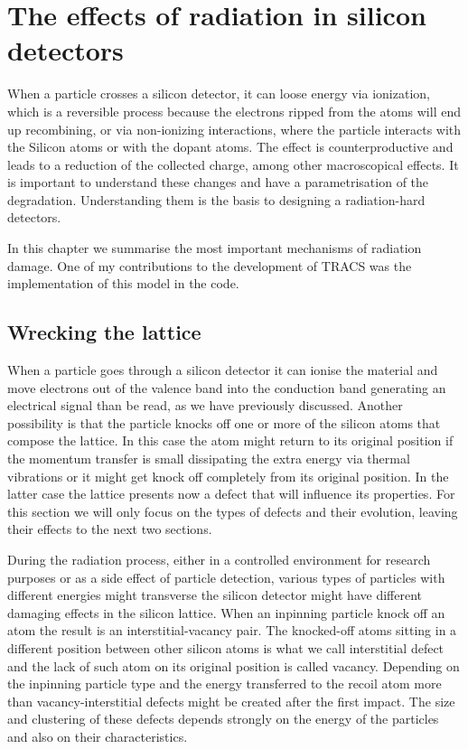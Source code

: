 \chapter{The effects of radiation in silicon detectors}
\label{sec:rad}

When a particle crosses a silicon detector, it can loose energy via ionization, which is a reversible process because the electrons ripped from the atoms will end up recombining, or via non-ionizing interactions, where the particle interacts with the Silicon atoms or with the dopant atoms. The effect is counterproductive and leads to a reduction of the collected charge, among other macroscopical effects. It is important to understand these changes and have a parametrisation of the degradation. Understanding them is the basis to designing a radiation-hard detectors.

In this chapter we summarise the most important mechanisms of radiation damage. One of my contributions to the development of TRACS was the implementation of this model in the code. 


\section{Wrecking the lattice}

When a particle goes through a silicon detector it can ionise the material and move electrons out of the valence band into the conduction band generating an electrical signal than be read, as we have previously discussed. Another possibility is that the particle knocks off one or more of the silicon atoms that compose the lattice. In this case the atom might return to its original position if the momentum transfer is small dissipating the extra energy via thermal vibrations or it might get knock off completely from its original position. In the latter case the lattice presents now a defect that will influence its properties. For this section we will only focus on the types of defects and their evolution, leaving their effects to the next two sections. 

During the radiation process, either in a controlled environment for research purposes or as a side effect of particle detection, various types of particles with different energies might transverse the silicon detector might have different damaging effects in the silicon lattice. When an inpinning particle knock off an atom the result is an interstitial-vacancy pair. The knocked-off atoms sitting in a different position between other silicon atoms is what we call interstitial defect and the lack of such atom on its original position is called vacancy. Depending on the inpinning particle type and the energy transferred to the recoil atom more than vacancy-interstitial defects might be created after the first impact. The size and clustering of these defects depends strongly on the energy of the particles and also on their characteristics. 


